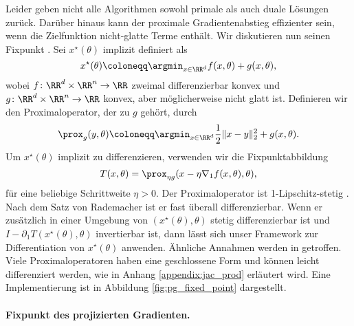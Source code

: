 Leider geben nicht alle Algorithmen sowohl primale als auch duale Lösungen zurück. 
Darüber hinaus kann der proximale Gradientenabstieg effizienter sein, wenn die Zielfunktion nicht-glatte Terme enthält.
Wir diskutieren nun seinen Fixpunkt \cite{niculae_2017, bertrand_2020_implicit, bertrand_2021_journal}.
Sei $x^\star(\theta)$ implizit definiert als
\begin{equation}
x^\star(\theta) \coloneqq \argmin_{x \in \RR^d} f(x, \theta) + g(x, \theta),
\label{eq:composite_pb}
\end{equation}
wobei $f \colon \RR^d \times \RR^n \to \RR$ zweimal differenzierbar konvex und $g \colon \RR^d \times \RR^n \to \RR$ konvex, aber möglicherweise nicht glatt ist.
Definieren wir den Proximaloperator, der zu $g$ gehört, durch
\begin{equation}
\prox_g(y, \theta) \coloneqq 
\argmin_{x \in \RR^d} \frac{1}{2} \|x - y\|^2_2 + g(x, \theta).
\end{equation}
Um $x^\star(\theta)$ implizit zu differenzieren, verwenden wir die Fixpunktabbildung \cite[p.150]{parikh_2014}
\begin{equation}
T(x, \theta) = \prox_{\eta g}(x - \eta \nabla_1 f(x, \theta), \theta),
\label{eq:proximal_grad_fp}
\end{equation}
für eine beliebige Schrittweite $\eta > 0$.
Der Proximaloperator ist 1-Lipschitz-stetig \cite{Moreau1965Proximite}. Nach dem Satz von Rademacher ist er fast überall differenzierbar. Wenn er zusätzlich in einer Umgebung von $(x^\star(\theta),\theta)$ stetig differenzierbar ist und $I - \partial_1 T(x^\star(\theta),\theta)$ invertierbar ist, dann lässt sich unser Framework zur Differentiation von $x^\star(\theta)$ anwenden. Ähnliche Annahmen werden in \cite{bertrand_2021_journal} getroffen.
Viele Proximaloperatoren haben eine geschlossene Form und können leicht differenziert werden, wie in Anhang \ref{appendix:jac_prod} erläutert wird. Eine Implementierung ist in Abbildung \ref{fig:pg_fixed_point} dargestellt.

\paragraph{Fixpunkt des projizierten Gradienten.} 

